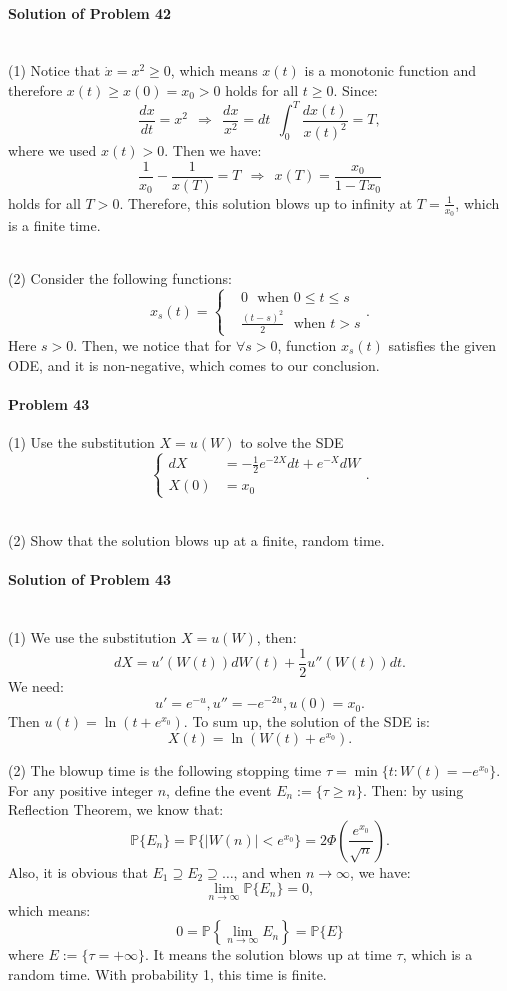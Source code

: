 \documentclass{article}
\begin{document}
\paragraph{Solution of Problem 42} ~\\
(1) Notice that $\dot{x}=x^2\geqslant 0$, which means $x(t)$ is a monotonic function and therefore $x(t)\geqslant x(0)=x_0 > 0$ holds for all $t\geqslant 0$. Since:
\[\frac{dx}{dt}=x^2~~\Rightarrow~~\frac{dx}{x^2}=dt~~\int_{0}^T \frac{dx(t)}{x(t)^2}=T,\]
where we used $x(t)> 0$. Then we have:
\[\frac{1}{x_0}-\frac{1}{x(T)}=T~~\Rightarrow~~x(T)=\frac{x_0}{1-Tx_0}\]
holds for all $T > 0$. Therefore, this solution blows up to infinity at $T=\frac{1}{x_0}$, which is a finite time. 

~\\
(2) Consider the following functions:
\[x_{s}(t)=\begin{cases}&0~~~\mbox{when $0\leqslant t \leqslant s$}\\ &\frac{(t-s)^2}{2}~~~\mbox{when $t>s$}\end{cases}.\]
Here $s > 0$. Then, we notice that for $\forall s >0$, function $x_s(t)$ satisfies the given ODE, and it is non-negative, which comes to our conclusion. 



\paragraph{Problem 43} (1) Use the substitution $X=u(W)$ to solve the SDE
\[\begin{cases}dX&=-\frac12 e^{-2X}dt+e^{-X}dW\\ X(0)&=x_0\end{cases}.\]

~\\
(2) Show that the solution blows up at a finite, random time. 

\paragraph{Solution of Problem 43} ~\\
(1) We use the substitution $X=u(W)$, then:
\[dX = u'(W(t))dW(t) + \frac12 u''(W(t))dt.\]
We need: 
\[u' = e^{-u}, u''=-e^{-2u}, u(0)=x_0.\]
Then $u(t)=\ln(t+e^{x_0})$. To sum up, the solution of the SDE is:
\[X(t)=\ln(W(t)+e^{x_0}).\]

(2) The blowup time is the following stopping time $\tau = \min\{t : W(t) = -e^{x_0}\}$. For any positive integer $n$, define the event $E_n := \{\tau\geqslant n\}$. Then: by using Reflection Theorem, we know that:
\[\mathbb{P}\{E_n\} = \mathbb{P}\{|W(n)| < e^{x_0}\}=2\Phi\left(\frac{e^{x_0}}{\sqrt{n}}\right).\]
Also, it is obvious that $E_1 \supseteq E_2 \supseteq \ldots$, and when $n\rightarrow \infty$, we have:
\[\lim_{n\rightarrow\infty}\mathbb{P}\{E_n\}=0,\]
which means:
\[0=\mathbb{P}\left\{\lim_{n\rightarrow\infty}E_n\right\}=\mathbb{P}\{E\}\]
where $E:=\{\tau=+\infty\}$. It means the solution blows up at time $\tau$, which is a random time. With probability 1, this time is finite. 
\end{document}
